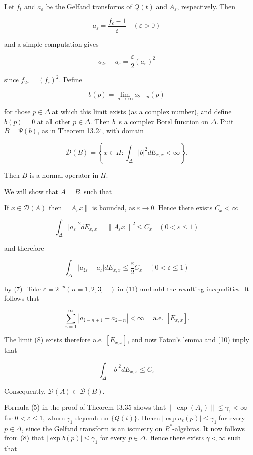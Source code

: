 \documentclass[10pt]{article}
\begin{document}
Let $f_{t}$ and $a_{\varepsilon}$ be the Gelfand transforms of $Q(t)$ and $A_{\varepsilon}$, respectively. Then

$$
a_{\varepsilon}=\frac{f_{\varepsilon}-1}{\varepsilon} \quad(\varepsilon>0)
$$

and a simple computation gives

$$
a_{2 \varepsilon}-a_{\varepsilon}=\frac{\varepsilon}{2}\left(a_{\varepsilon}\right)^{2}
$$

since $f_{2 \varepsilon}=\left(f_{\varepsilon}\right)^{2}$. Define

$$
b(p)=\lim _{n \rightarrow \infty} a_{2-n}(p)
$$

for those $p \in \Delta$ at which this limit exists (as a complex number), and define $b(p)=0$ at all other $p \in \Delta$. Then $b$ is a complex Borel function on $\Delta$. Puit $B=\Psi(b)$, as in Theorem 13.24, with domain

$$
\mathscr{D}(B)=\left\{x \in H: \int_{\Delta}|b|^{2} d E_{x, x}<\infty\right\} .
$$

Then $B$ is a normal operator in $H$.

We will show that $A=B$. such that

If $x \in \mathscr{D}(A)$ then $\left\|A_{\varepsilon} x\right\|$ is bounded, as $\varepsilon \rightarrow 0$. Hence there exists $C_{x}<\infty$

$$
\int_{\Delta}\left|a_{\varepsilon}\right|^{2} d E_{x, x}=\left\|A_{\varepsilon} x\right\|^{2} \leq C_{x} \quad(0<\varepsilon \leq 1)
$$

and therefore

$$
\int_{\Delta}\left|a_{2 \varepsilon}-a_{\varepsilon}\right| d E_{x, x} \leq \frac{\varepsilon}{2} C_{x} \quad(0<\varepsilon \leq 1)
$$

by (7). Take $\varepsilon=2^{-n}(n=1,2,3, \ldots)$ in (11) and add the resulting inequalities. It follows that

$$
\sum_{n=1}^{\infty}\left|a_{2-n+1}-a_{2-n}\right|<\infty \quad \text { a.e. }\left[E_{x, x}\right] .
$$

The limit (8) exists therefore a.e. $\left[E_{x, x}\right]$, and now Fatou's lemma and (10) imply that

$$
\int_{\Delta}|b|^{2} d E_{x, x} \leq C_{x}
$$

Consequently, $\mathscr{D}(A) \subset \mathscr{D}(B)$.

Formula (5) in the proof of Theorem 13.35 shows that $\left\|\exp \left(A_{\varepsilon}\right)\right\| \leq \gamma_{1}<\infty$ for $0<\varepsilon \leq 1$, where $\gamma_{1}$ depends on $\{Q(t)\}$. Hence $\left|\exp a_{\varepsilon}(p)\right| \leq \gamma_{1}$ for every $p \in \Delta$, since the Gelfand transform is an isometry on $B^{*}$-algebras. It now follows
from (8) that $|\exp b(p)| \leq \gamma_{1}$ for every $p \in \Delta$. Hence there exists $\gamma<\infty$ such that
\end{document}
